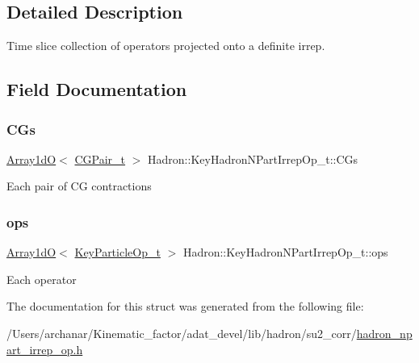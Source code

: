 \subsection{Detailed Description}
Time slice collection of operators projected onto a definite irrep. 

\subsection{Field Documentation}
\mbox{\label{structHadron_1_1KeyHadronNPartIrrepOp__t_ad578b34132c3bac4ce6145520e4e878d}} 
\subsubsection{\texorpdfstring{CGs}{CGs}}
{\footnotesize\ttfamily \mbox{\hyperlink{classADAT_1_1Array1dO}{Array1dO}}$<$ \mbox{\hyperlink{structHadron_1_1KeyHadronNPartIrrepOp__t_1_1CGPair__t}{C\+G\+Pair\+\_\+t}} $>$ Hadron\+::\+Key\+Hadron\+N\+Part\+Irrep\+Op\+\_\+t\+::\+C\+Gs}

Each pair of CG contractions \mbox{\label{structHadron_1_1KeyHadronNPartIrrepOp__t_a7784c45d582e672b8ade01f544e85cfe}} 
\subsubsection{\texorpdfstring{ops}{ops}}
{\footnotesize\ttfamily \mbox{\hyperlink{classADAT_1_1Array1dO}{Array1dO}}$<$ \mbox{\hyperlink{structHadron_1_1KeyParticleOp__t}{Key\+Particle\+Op\+\_\+t}} $>$ Hadron\+::\+Key\+Hadron\+N\+Part\+Irrep\+Op\+\_\+t\+::ops}

Each operator 

The documentation for this struct was generated from the following file\+:\begin{DoxyCompactItemize}
\item 
/\+Users/archanar/\+Kinematic\+\_\+factor/adat\+\_\+devel/lib/hadron/su2\+\_\+corr/\mbox{\hyperlink{lib_2hadron_2su2__corr_2hadron__npart__irrep__op_8h}{hadron\+\_\+npart\+\_\+irrep\+\_\+op.\+h}}\end{DoxyCompactItemize}
